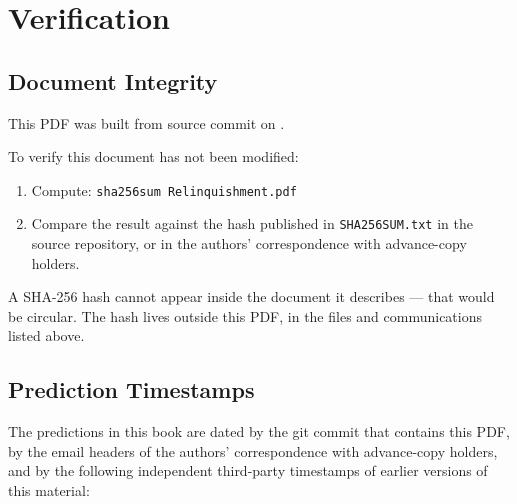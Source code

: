 
\chapter*{Verification}

\section*{Document Integrity}
\label{back:document-integrity}

This PDF was built from source commit \texttt{\GitHash} on \GitDate.

To verify this document has not been modified:

\begin{enumerate}
\item Compute: \texttt{sha256sum Relinquishment.pdf}
\item Compare the result against the hash published in \texttt{SHA256SUM.txt} in the source repository, or in the authors' correspondence with advance-copy holders.
\end{enumerate}

A SHA-256 hash cannot appear inside the document it describes --- that would be circular. The hash lives outside this PDF, in the files and communications listed above.

\section*{Prediction Timestamps}
\label{back:prediction-timestamps}

The predictions in this book are dated by the git commit that contains this PDF, by the email headers of the authors' correspondence with advance-copy holders, and by the following independent third-party timestamps of earlier versions of this material:

